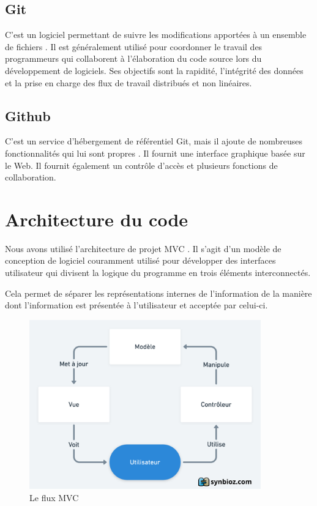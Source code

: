 \documentclass[french, a4paper, 12pt]{report}
\begin{document}
		\subsection*{Git} C'est un logiciel permettant de suivre les modifications apportées à un ensemble de fichiers \cite{git}. Il est généralement utilisé pour coordonner le travail des programmeurs qui collaborent à l'élaboration du code source lors du développement de logiciels. Ses objectifs sont la rapidité, l'intégrité des données et la prise en charge des flux de travail distribués et non linéaires.

		\subsection*{Github} C'est un service d'hébergement de référentiel Git, mais il ajoute de nombreuses fonctionnalités qui lui sont propres \cite{gthb}. Il fournit une interface graphique basée sur le Web. Il fournit également un contrôle d'accès et plusieurs fonctions de collaboration.
	\section{Architecture du code} %
		Nous avons utilisé l'architecture de projet MVC \cite{mvc}. Il s'agit d'un modèle de conception de logiciel couramment utilisé pour développer des interfaces utilisateur qui divisent la logique du programme en trois éléments interconnectés.

Cela permet de séparer les représentations internes de l'information de la manière dont l'information est présentée à l'utilisateur et acceptée par celui-ci.
\begin{figure}[!h]
  \center
  \includegraphics[width=10cm]{mvc.png}
  \caption{Le flux MVC}
  \label{fig:fluxmvc}
\end{figure}
\end{document}
